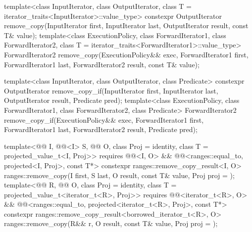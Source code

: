 %
%
\begin{itemdecl}
template<class InputIterator, class OutputIterator,
         class T = iterator_traits<InputIterator>::value_type>
  constexpr OutputIterator
    remove_copy(InputIterator first, InputIterator last,
                OutputIterator result, const T& value);
template<class ExecutionPolicy, class ForwardIterator1, class ForwardIterator2,
         class T = iterator_traits<ForwardIterator1>::value_type>
  ForwardIterator2
    remove_copy(ExecutionPolicy&& exec,
                ForwardIterator1 first, ForwardIterator1 last,
                ForwardIterator2 result, const T& value);

template<class InputIterator, class OutputIterator, class Predicate>
  constexpr OutputIterator
    remove_copy_if(InputIterator first, InputIterator last,
                   OutputIterator result, Predicate pred);
template<class ExecutionPolicy, class ForwardIterator1, class ForwardIterator2,
         class Predicate>
  ForwardIterator2
    remove_copy_if(ExecutionPolicy&& exec,
                   ForwardIterator1 first, ForwardIterator1 last,
                   ForwardIterator2 result, Predicate pred);

template<@@ I, @@<I> S, @@ O,
         class Proj = identity, class T = projected_value_t<I, Proj>>
  requires @@<I, O> &&
           @@<ranges::equal_to, projected<I, Proj>, const T*>
  constexpr ranges::remove_copy_result<I, O>
    ranges::remove_copy(I first, S last, O result, const T& value, Proj proj = {});
template<@@ R, @@ O, class Proj = identity,
         class T = projected_value_t<iterator_t<R>, Proj>>
  requires @@<iterator_t<R>, O> &&
           @@<ranges::equal_to, projected<iterator_t<R>, Proj>, const T*>
  constexpr ranges::remove_copy_result<borrowed_iterator_t<R>, O>
    ranges::remove_copy(R&& r, O result, const T& value, Proj proj = {});


\end{itemdecl}
